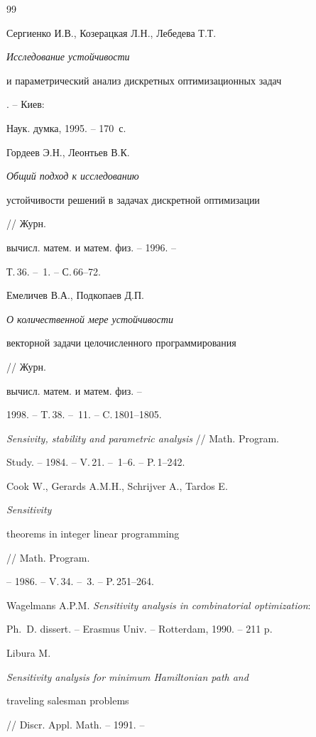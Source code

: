 \begin{thebibliography}{99}







Сергиенко И.В., Козерацкая Л.Н., Лебедева Т.Т. 


{\em Исследование устойчивости


и параметрический анализ дискретных оптимизационных задач}. -- Киев: 


Наук. думка, 1995. -- 170~с.




Гордеев Э.Н., Леонтьев В.К. {\em Общий подход к исследованию 


устойчивости решений в задачах дискретной оптимизации} // Журн.


вычисл. матем. и матем. физ. -- 1996. --


Т.\,36. -- \No\,1. -- С.\,66--72.




Емеличев В.А., Подкопаев Д.П. {\em О количественной мере устойчивости


векторной задачи целочисленного программирования} // Журн.


вычисл. матем. и матем. физ. -- 


1998. -- T.\,38. -- \No\,11. -- C.\,1801--1805.




{\em Sensivity, stability and parametric analysis} // Math. Program.


Study. -- 1984. -- V.\,21. -- \No\,1--6. -- P.\,1--242.




Cook W., Gerards A.M.H., Schrijver A., Tardos E. {\em Sensitivity


theorems in integer linear programming} // Math. Program.  


-- 1986. -- V.\,34. -- \No\,3. -- P.\,251--264.




Wagelmans A.P.M. {\em Sensitivity analysis in combinatorial optimization}:


Ph.~D. dissert. -- Erasmus  Univ. -- Rotterdam, 1990. -- 211 p.




Libura M. {\em Sensitivity analysis for minimum  Hamiltonian path and


traveling salesman problems} // Discr. Appl. Math. -- 1991. -- 



\end{thebibliography}
